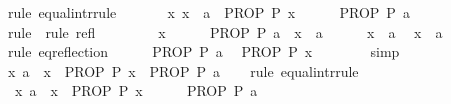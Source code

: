 \begin{isabellebody}
\ {\isacharparenleft}{\kern0pt}rule\ equal{\isacharunderscore}{\kern0pt}intr{\isacharunderscore}{\kern0pt}rule{\isacharparenright}{\kern0pt}\isanewline
\ \ \ \ \isamarkupfalse%
\ {\isacharasterisk}{\kern0pt}{\isacharcolon}{\kern0pt}\ {\isacartoucheopen}{\isasymAnd}x{\isachardot}{\kern0pt}\ x\ {\isacharequal}{\kern0pt}\ a\ {\isasymLongrightarrow}\ PROP\ P\ x{\isacartoucheclose}\isanewline
\ \ \ \ \isamarkupfalse%
\ {\isacartoucheopen}PROP\ P\ a{\isacartoucheclose}\isanewline
\ \ \ \ \ \ \isamarkupfalse%
\ {\isacharparenleft}{\kern0pt}rule\ {\isacharasterisk}{\kern0pt}{\isacharparenright}{\kern0pt}\ {\isacharparenleft}{\kern0pt}rule\ refl{\isacharparenright}{\kern0pt}\isanewline
\ \ \isamarkupfalse%
\isanewline
\ \ \ \ \isamarkupfalse%
\ x\isanewline
\ \ \ \ \isamarkupfalse%
\ {\isacartoucheopen}PROP\ P\ a{\isacartoucheclose}\ \ {\isacartoucheopen}x\ {\isacharequal}{\kern0pt}\ a{\isacartoucheclose}\isanewline
\ \ \ \ \isamarkupfalse%
\ {\isacartoucheopen}x\ {\isacharequal}{\kern0pt}\ a{\isacartoucheclose}\ \isamarkupfalse%
\ {\isacartoucheopen}x\ {\isasymequiv}\ a{\isacartoucheclose}\isanewline
\ \ \ \ \ \ \isamarkupfalse%
\ {\isacharparenleft}{\kern0pt}rule\ eq{\isacharunderscore}{\kern0pt}reflection{\isacharparenright}{\kern0pt}\isanewline
\ \ \ \ \isamarkupfalse%
\ {\isacartoucheopen}PROP\ P\ a{\isacartoucheclose}\ \isamarkupfalse%
\ {\isacartoucheopen}PROP\ P\ x{\isacartoucheclose}\isanewline
\ \ \ \ \ \ \isamarkupfalse%
\ simp\isanewline
\ \ \isamarkupfalse%
\isanewline
\ \ \isamarkupfalse%
\ {\isacartoucheopen}{\isacharparenleft}{\kern0pt}{\isasymAnd}x{\isachardot}{\kern0pt}\ a\ {\isacharequal}{\kern0pt}\ x\ {\isasymLongrightarrow}\ PROP\ P\ x{\isacharparenright}{\kern0pt}\ {\isasymequiv}\ PROP\ P\ a{\isacartoucheclose}\isanewline
\ \ \isamarkupfalse%
\ {\isacharparenleft}{\kern0pt}rule\ equal{\isacharunderscore}{\kern0pt}intr{\isacharunderscore}{\kern0pt}rule{\isacharparenright}{\kern0pt}\isanewline
\ \ \ \ \isamarkupfalse%
\ {\isacharasterisk}{\kern0pt}{\isacharcolon}{\kern0pt}\ {\isacartoucheopen}{\isasymAnd}x{\isachardot}{\kern0pt}\ a\ {\isacharequal}{\kern0pt}\ x\ {\isasymLongrightarrow}\ PROP\ P\ x{\isacartoucheclose}\isanewline
\ \ \ \ \isamarkupfalse%
\ {\isacartoucheopen}PROP\ P\ a{\isacartoucheclose}\isanewline
\ \ \ \ \ \ \isamarkupfalse%

\end{isabellebody}
